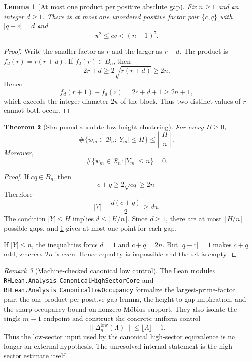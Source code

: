 \documentclass[11pt]{article}
\newtheorem{theorem}{Theorem}[section]
\newtheorem{lemma}[theorem]{Lemma}
\theoremstyle{definition}
\theoremstyle{remark}
\newtheorem{remark}[theorem]{Remark}
\newcommand{\1}{\mathbf{1}}
\begin{document}
\begin{lemma}[At most one product per positive absolute gap]
\label{lem:one-product-gap}
Fix $n\ge1$ and an integer $d\ge1$.  There is at most one unordered
positive factor pair $\{c,q\}$ with $|q-c|=d$ and
\begin{equation}
 n^2\le cq<(n+1)^2.
 \label{eq:gap-block-condition}
\end{equation}
\end{lemma}

\begin{proof}
Write the smaller factor as $r$ and the larger as $r+d$.  The product is
$f_d(r)=r(r+d)$.  If $f_d(r)\in B_n$, then
\[
 2r+d\ge2\sqrt{r(r+d)}\ge2n.
\]
Hence
\[
 f_d(r+1)-f_d(r)=2r+d+1\ge2n+1,
\]
which exceeds the integer diameter $2n$ of the block.  Thus two
distinct values of $r$ cannot both occur.
\end{proof}

\begin{theorem}[Sharpened absolute low-height clustering]
\label{thm:absolute-clustering}
For every $H\ge0$,
\begin{equation}
 \boxed{
 \#\{w_m\in\mathscr B_n:|Y_m|\le H\}
 \le
 \left\lfloor\frac{H}{n}\right\rfloor.
 }
 \label{eq:absolute-clustering}
\end{equation}
Moreover,
\begin{equation}
 \boxed{
 \#\{w_m\in\mathscr B_n:|Y_m|\le n\}=0.
 }
 \label{eq:no-height-n-points}
\end{equation}
\end{theorem}

\begin{proof}
If $cq\in B_n$, then
\[
 c+q\ge2\sqrt{cq}\ge2n.
\]
Therefore
\[
 |Y|=\frac{d(c+q)}2\ge dn.
\]
The condition $|Y|\le H$ implies
$d\le\lfloor H/n\rfloor$.  Since $d\ge1$, there are at most
$\lfloor H/n\rfloor$ possible gaps, and
\cref{lem:one-product-gap} gives at most one point for each gap.

If $|Y|\le n$, the inequalities force $d=1$ and $c+q=2n$.
But $|q-c|=1$ makes $c+q$ odd, whereas $2n$ is even.  Hence equality is
impossible and the set is empty.
\end{proof}

\begin{remark}[Machine-checked canonical low control]
The Lean modules \texttt{RHLean.Analysis.CanonicalHighSectorCore} and
\texttt{RHLean.Analysis.CanonicalLowOccupancy} formalize the largest-prime-factor
pair, the one-product-per-positive-gap lemma, the height-to-gap implication, and
the sharp occupancy bound on nonzero M\"obius support.  They also isolate the
single $m=1$ endpoint and construct the concrete uniform control
\[
 \|\Delta_n^{\mathrm{low}}(\Lambda)\|
 \le \lfloor\Lambda\rfloor+1.
\]
Thus the low-sector input used by the canonical high-sector equivalence is no
longer an external hypothesis.  The unresolved internal statement is the
high-sector estimate itself.
\end{remark}
\end{document}
